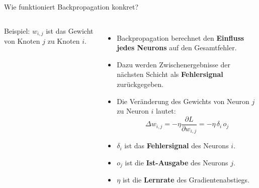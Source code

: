\begin{frame}{Wie funktioniert Backpropagation konkret?}
\begin{columns}
{%
}

\vspace{0.15cm}
{\scriptsize Beispiel: $w_{i,j}$ ist das Gewicht von Knoten $j$ zu Knoten $i$.}

\footnotesize
\begin{itemize}
    \item Backpropagation berechnet den \textbf{Einfluss jedes Neurons}
          auf den Gesamtfehler.

    \item Dazu werden Zwischenergebnisse der nächsten Schicht als
          \textbf{Fehlersignal} zurückgegeben.

    \item Die Veränderung des Gewichts von Neuron $j$ zu Neuron $i$ lautet:
          \[
              \Delta w_{i,j}
              =
              -\eta
              \frac{\partial L}{\partial w_{i,j}}
              =
              -\eta\,\delta_i\, o_j
          \]

    \item $\delta_i$ ist das \textbf{Fehlersignal} des Neurons $i$.

    \item $o_j$ ist die \textbf{Ist-Ausgabe} des Neurons $j$.

    \item $\eta$ ist die \textbf{Lernrate} des Gradientenabstiegs.
\end{itemize}

\end{columns}
\end{frame}


